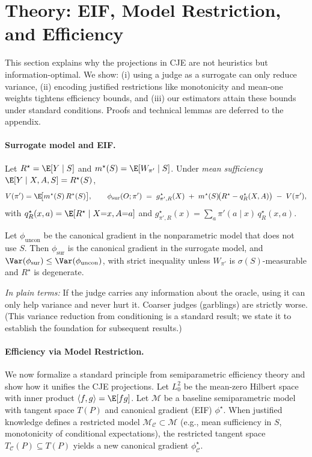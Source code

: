 \section{Theory: EIF, Model Restriction, and Efficiency}
\label{sec:theory}

This section explains why the projections in CJE are not heuristics but information-optimal. We show: (i) using a judge as a surrogate can only reduce variance, (ii) encoding justified restrictions like monotonicity and mean-one weights tightens efficiency bounds, and (iii) our estimators attain these bounds under standard conditions. Proofs and technical lemmas are deferred to the appendix.

\paragraph{Surrogate model and EIF.}
Let $R^\star=\E[Y\mid S]$ and $m^\star(S)=\E[W_{\pi'}\mid S]$. Under \emph{mean sufficiency}
$\E[Y\mid X,A,S]=R^\star(S)$,
\[
V(\pi')=\E\!\big[m^\star(S)\,R^\star(S)\big],
\qquad
\phi_{\mathrm{sur}}(O;\pi') \;=\; g^\star_{\pi',R}(X) \;+\; m^\star(S)\!\big(R^\star-q^\star_R(X,A)\big) \;-\; V(\pi'),
\]
with $q^\star_R(x,a)=\E[R^\star\mid X{=}x,A{=}a]$ and $g^\star_{\pi',R}(x)=\sum_a \pi'(a\mid x)\,q^\star_R(x,a)$.

\begin{theorem}
\label{thm:sur-eif}
Let $\phi_{\mathrm{uncon}}$ be the canonical gradient in the nonparametric model that does not use $S$.
Then $\phi_{\mathrm{sur}}$ is the canonical gradient in the surrogate model, and
$\Var(\phi_{\mathrm{sur}})\le \Var(\phi_{\mathrm{uncon}})$,
with strict inequality unless $W_{\pi'}$ is $\sigma(S)$-measurable and $R^\star$ is degenerate.
\end{theorem}

\noindent\emph{In plain terms:} If the judge carries any information about the oracle, using it can only help variance and never hurt it. Coarser judges (garblings) are strictly worse. (This variance reduction from conditioning is a standard result; we state it to establish the foundation for subsequent results.)

\paragraph{Efficiency via Model Restriction.}
We now formalize a standard principle from semiparametric efficiency theory and show how it unifies the CJE projections.
Let $L^2_0$ be the mean-zero Hilbert space with inner product $\langle f,g\rangle=\E[fg]$.
Let $\mathcal{M}$ be a baseline semiparametric model with tangent space $T(P)$ and canonical gradient
(EIF) $\phi^\star$. When justified knowledge defines a restricted model $\mathcal{M}_\mathcal{C} \subset \mathcal{M}$
(e.g., mean sufficiency in $S$, monotonicity of conditional expectations), the restricted tangent space
$T_\mathcal{C}(P) \subseteq T(P)$ yields a new canonical gradient $\phi^\star_\mathcal{C}$.

